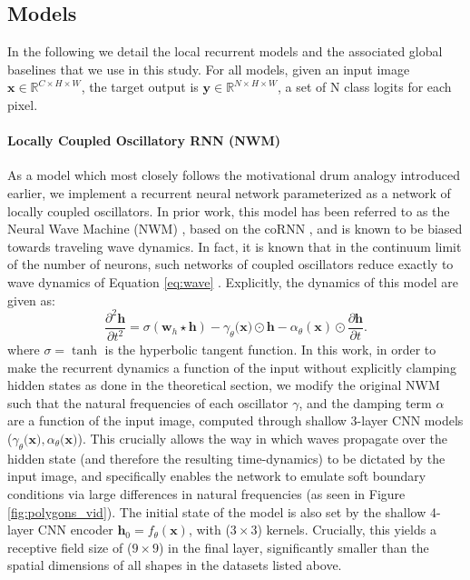 \subsection{Models}
In the following we detail the local recurrent models and the associated global baselines that we use in this study. For all models, given an input image $\mathbf{x} \in \mathbb{R}^{C \times H \times W}$, the target output is $\mathbf{y} \in \mathbb{R}^{N \times H \times W}$, a set of N class logits for each pixel.

\paragraph{Locally Coupled Oscillatory RNN (NWM)} As a model which most closely follows the motivational drum analogy introduced earlier, we implement a recurrent neural network parameterized as a network of locally coupled oscillators. In prior work, this model has been referred to as the Neural Wave Machine (NWM) \citep{nwm}, based on the coRNN \citep{cornn}, and is known to be biased towards traveling wave dynamics. In fact, it is known that in the continuum limit of the number of neurons, such networks of coupled oscillators reduce exactly to wave dynamics of Equation \ref{eq:wave} \citep{harvard_lecture_4}. Explicitly, the dynamics of this model are given as:
\begin{equation}
\label{eqn:nwm}
\frac{\partial^2 \mathbf{h}}{\partial t^2} = \sigma\left(\mathbf{w}_{h} \star \mathbf{h}\right) - \gamma_{\theta}(\mathbf{x)} \odot \mathbf{h} - \alpha_{\theta}(\mathbf{x}) \odot \frac{\partial \mathbf{h}}{\partial t}.
\end{equation}
where $\sigma = \tanh$ is the hyperbolic tangent function. In this work, in order to make the recurrent dynamics a function of the input without explicitly clamping hidden states as done in the theoretical section, we modify the original NWM such that the natural frequencies of each oscillator $\gamma$, and the damping term $\alpha$ are a function of the input image, computed through shallow 3-layer CNN models ($\gamma_{\theta}(\mathbf{x)}, \alpha_{\theta}(\mathbf{x)}$). This crucially allows the way in which waves propagate over the hidden state (and therefore the resulting time-dynamics) to be dictated by the input image, and specifically enables the network to emulate soft boundary conditions via large differences in natural frequencies (as seen in Figure \ref{fig:polygons_vid}). The initial state of the model is also set by the shallow 4-layer CNN encoder $\mathbf{h}_0 = f_{\theta}(\mathbf{x})$, with ($3 \times 3$) kernels. Crucially, this yields a receptive field size of ($9 \times 9$) in the final layer, significantly smaller than the spatial dimensions of all shapes in the datasets listed above.

